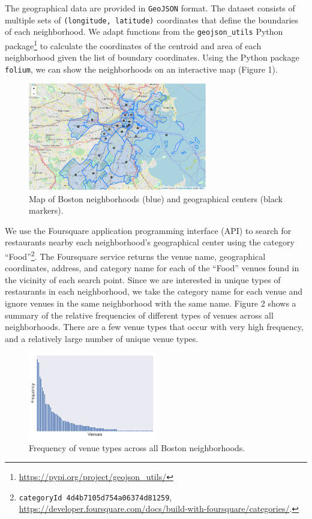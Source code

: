 \documentclass[11pt, a4paper]{article} %
\begin{document}
The geographical data are provided in \texttt{GeoJSON} format.
The dataset consists of multiple sets of \texttt{(longitude, latitude)} coordinates that define the boundaries of each neighborhood.
We adapt functions from the \texttt{geojson\_utils} Python package\footnote{\url{https://pypi.org/project/geojson_utils/}} to calculate the coordinates of the centroid and area of each neighborhood given the list of boundary coordinates.
Using the Python package \texttt{folium}, we can show the neighborhoods on an interactive map (Figure 1).

\begin{figure}
\begin{center}
\includegraphics[width=0.7\textwidth]{folium_map.png}
\end{center}
\caption{Map of Boston neighborhoods (blue) and geographical centers (black markers).}
\end{figure}

We use the Foursquare application programming interface (API) to search for restaurants nearby each neighborhood's geographical center using the category ``Food''\footnote{\texttt{categoryId 4d4b7105d754a06374d81259}, \url{https://developer.foursquare.com/docs/build-with-foursquare/categories/}.}.
The Foursquare service returns the venue name, geographical coordinates, address, and category name for each of the ``Food'' venues found in the vicinity of each search point.
Since we are interested in unique types of restaurants in each neighborhood, we take the category name for each venue and ignore venues in the same neighborhood with the same name.
Figure 2 shows a summary of the relative frequencies of different types of venues across all neighborhoods. 
There are a few venue types that occur with very high frequency, and a relatively large number of unique venue types.

\begin{figure}
\begin{center}
\includegraphics[width=0.5\textwidth]{summary_bar.pdf}
\end{center}
\caption{Frequency of venue types across all Boston neighborhoods.}
\end{figure}
\end{document}
